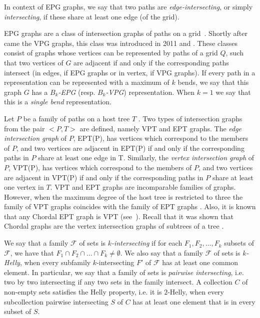 In context of EPG graphs, we say that two paths are
 \emph{edge-intersecting}, or simply  \emph{intersecting}, if these share at least one edge (of the grid).
 
 
 EPG graphs are a class of  intersection graphs of paths on a grid~\cite{golumbic2009}. Shortly after came the VPG graphs, this class was introduced in 2011 \cite{asinowski2011string} and \cite{asinowski2012}. 
 These classes consist of graphs whose vertices can be represented by paths of a grid $ Q$, such that two vertices of $ G $ are adjacent if and only if the corresponding paths intersect (in edges, if EPG graphs or in vertex, if VPG graphs). If every path in a representation can be represented with a maximum of $ k $ bends, we say that this graph $ G $ has a  \emph{$ B_k$-EPG} (resp. \emph{$ B_k$-VPG}) representation. When $ k = 1 $ we say that this is a \emph{single bend} representation.

 Let $P$ be a family of paths on a host tree $T$ . Two types of intersection graphs from the pair $<P,T>$ are defined, namely VPT and EPT graphs.
The \textit{edge intersection graph} of $P$, EPT(P), has vertices which correspond to the members of $P$, and two vertices are adjacent in EPT(P) if and only if the corresponding paths in $P$ share at least one edge in T. Similarly, the \textit{vertex intersection graph} of $P$, VPT(P), has vertices which correspond to the members of $P$, and two vertices are adjacent in VPT(P) if and only if the corresponding paths in $P$ share at least one vertex in $T$.
%
VPT and EPT graphs are incomparable families of graphs. However, when the maximum degree of the host tree is restricted to three the family of VPT graphs coincides with the family of EPT graphs \cite{golumbic1985edge}. Also, it is known that any Chordal EPT graph is VPT (see~\cite{syslo1985triangulated}). Recall that it was shown that Chordal graphs are the vertex intersection graphs of subtrees of a tree \cite{gavril1974intersection}.

We say that a family  $\mathcal{F}$ of sets is \emph{$k$-intersecting} if for each $F_1, F_2, \dots, F_k$ subsets of $\mathcal{F}$, we have that $F_1\cap F_2 \cap \dots \cap F_k \neq \emptyset$. We also say that a family $\mathcal{F}$  of sets is \emph{$k$-Helly}, when every subfamily $k$-intersecting $F'$ of  $\mathcal{F}$ has at least one common element.
 In particular, we say that a family of sets is \emph{pairwise intersecting}, i.e. two by two intersecting if any two sets in the family intersect. A collection $ C $ of non-empty sets satisfies the Helly property, i.e. it is $ 2$-Helly, when every subcollection pairwise intersecting $ S $  of $ C $ has at least one element that is in every subset of $ S$.

